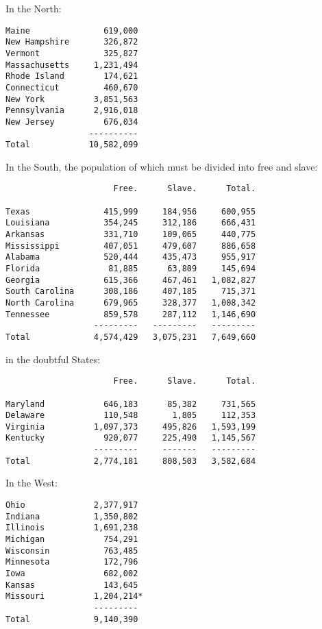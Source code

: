 In the North:

{\small
\begin{verbatim}
Maine               619,000
New Hampshire       326,872
Vermont             325,827
Massachusetts     1,231,494
Rhode Island        174,621
Connecticut         460,670
New York          3,851,563
Pennsylvania      2,916,018
New Jersey          676,034
                 ----------
Total            10,582,099
\end{verbatim}}

In the South, the population of which must be divided into free and
slave:


{\small
\begin{verbatim}
                      Free.      Slave.      Total.

Texas               415,999     184,956     600,955
Louisiana           354,245     312,186     666,431
Arkansas            331,710     109,065     440,775
Mississippi         407,051     479,607     886,658
Alabama             520,444     435,473     955,917
Florida              81,885      63,809     145,694
Georgia             615,366     467,461   1,082,827
South Carolina      308,186     407,185     715,371
North Carolina      679,965     328,377   1,008,342
Tennessee           859,578     287,112   1,146,690
                  ---------   ---------   ---------
Total             4,574,429   3,075,231   7,649,660
\end{verbatim}}


in the doubtful States:


{\small
\begin{verbatim}
                      Free.      Slave.      Total.

Maryland            646,183      85,382     731,565
Delaware            110,548       1,805     112,353
Virginia          1,097,373     495,826   1,593,199
Kentucky            920,077     225,490   1,145,567
                  ---------     -------   ---------
Total             2,774,181     808,503   3,582,684
\end{verbatim}}


In the West:

{\small
\begin{verbatim}
Ohio              2,377,917
Indiana           1,350,802
Illinois          1,691,238
Michigan            754,291
Wisconsin           763,485
Minnesota           172,796
Iowa                682,002
Kansas              143,645
Missouri          1,204,214*
                  ---------
Total             9,140,390
\end{verbatim}}


